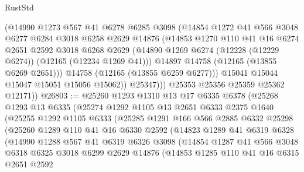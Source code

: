 \begin{lexlean}{RustStd}
\begin{coremodule}
                (@14990
                  @1273
                  @567
                  @41
                  @6278
                  @6285
                  @3098
                  (@14854
                    @1272
                    @41
                    @566
                    @3048
                    @6277
                    @6284
                    @3018
                    @6258
                    @2629
                    @14876
                    (@14853
                      @1270
                      @110
                      @41
                      @16
                      @6274
                      @2651
                      @2592
                      @3018
                      @6268
                      @2629
                      (@14890 @1269 @6274 (@12228 (@12229 @6274)) (@12165 (@12234 @1269 @41)))
                      @14897
                      @14758
                      (@12165 (@13855 @6269 @2651)))
                    @14758
                    (@12165 (@13855 @6259 @6277)))
                  @15041
                  @15044
                  @15047
                  @15051
                  @15056
                  @15062))
              @25347)))
        @25353
        @25356
        @25359
        @25362
        @12171))
@26803 := @25260
    @1293
    @1310
    @13
    @17
    @6335
    @6378
    (@25268
      @1293
      @13
      @6335
      (@25274
        @1292
        @1105
        @13
        @2651
        @6333
        @2375
        @1640
        (@25255
          @1292
          @1105
          @6333
          (@25285
            @1291
            @166
            @566
            @2885
            @6332
            @25298
            (@25260
              @1289
              @110
              @41
              @16
              @6330
              @2592
              (@14823
                @1289
                @41
                @6319
                @6328
                (@14990
                  @1288
                  @567
                  @41
                  @6319
                  @6326
                  @3098
                  (@14854
                    @1287
                    @41
                    @566
                    @3048
                    @6318
                    @6325
                    @3018
                    @6299
                    @2629
                    @14876
                    (@14853
                      @1285
                      @110
                      @41
                      @16
                      @6315
                      @2651
                      @2592

\end{coremodule}
\end{lexlean}
